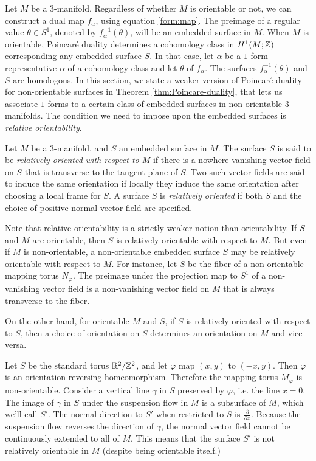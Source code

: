 Let $M$ be a 3-manifold.  Regardless of whether $M$ is orientable or not, we can construct a dual map $f_\alpha$, using equation \eqref{form:map}.
The preimage of a regular value $\theta \in S^1$, denoted by $f_{\alpha}^{-1}(\theta)$, will be an embedded surface in $M$.
When $M$ is orientable, Poincar\'e duality determines a cohomology class in $H^1(M; \mathbb{Z})$ corresponding any embedded surface $S$.
In that case, let $\alpha$ be a $1$-form representative $\alpha$ of a cohomology class and let $\theta$ of $f_{\alpha}$.  The surfaces $f_{\alpha}^{-1}(\theta)$ and $S$ are homologous.
In this section, we state a weaker version of Poincar\'e duality for non-orientable surfaces in Theorem \ref{thm:Poincare-duality}, that lets us associate $1$-forms to a certain class of embedded surfaces in non-orientable $3$-manifolds.
The condition we need to impose upon the embedded surfaces is \emph{relative orientability}.

  Let $M$ be a $3$-manifold, and $S$ an embedded surface in $M$.
  The surface $S$ is said to be \emph{relatively oriented with respect to $M$} if there is a nowhere vanishing vector field on $S$ that is transverse to the tangent plane of $S$.
  Two such vector fields are said to induce the same orientation if locally they induce the same orientation after choosing a local frame for $S$.
  A surface $S$ is \emph{relatively oriented} if both $S$ and the choice of positive normal vector field are specified.

Note that relative orientability is a strictly weaker notion than orientability.
If $S$ and $M$ are orientable, then $S$ is relatively orientable with respect to $M$.
But even if $M$ is non-orientable, a non-orientable embedded surface $S$ may be relatively orientable with respect to $M$.
For instance, let $S$ be the fiber of a non-orientable mapping torus $N_{\varphi}$.
The preimage under the projection map to $S^1$ of a non-vanishing vector field is a non-vanishing vector field on $M$ that is always transverse to the fiber.

On the other hand, for orientable $M$ and $S$, if $S$ is relatively oriented with respect to $S$, then a choice of orientation on $S$ determines an orientation on $M$ and vice versa.

  Let $S$ be the standard torus $\mathbb{R}^2/\mathbb{Z}^2$, and let $\varphi$ map $(x,y)$ to $(-x, y)$.
  Then $\varphi$ is an orientation-reversing homeomorphism.
  Therefore the mapping torus $M_\varphi$ is non-orientable.
  Consider a vertical line $\gamma$ in $S$ preserved by $\varphi$, i.e. the line
  $x = 0$.
  The image of $\gamma$ in $S$ under the suspension flow in $M$ is a subsurface of $M$, which we'll call $S'$.
  The normal direction to $S'$ when restricted to $S$ is $\frac{\partial}{\partial x}$.
  Because the suspension flow reverses the direction of $\gamma$, the normal vector field cannot be continuously extended to all of $M$.
  This means that the surface $S'$ is not relatively orientable in $M$ (despite being orientable itself.)

